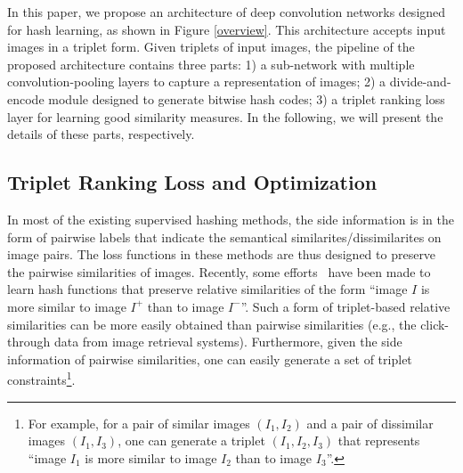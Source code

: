 \documentclass[10pt,twocolumn,letterpaper]{article}
\begin{document}
In this paper, we propose an architecture of deep convolution
networks designed for hash learning, as shown in Figure
\ref{overview}. This architecture accepts input images in a triplet
form. Given triplets of input images, the pipeline of the proposed
architecture contains three parts: 1) a sub-network with multiple
convolution-pooling layers to capture a representation of images; 2)
a divide-and-encode module designed to generate bitwise hash
codes; 3) a triplet ranking loss layer for learning good similarity
measures. In the following, we will present the details of these
parts, respectively.

\subsection{Triplet Ranking Loss and Optimization}
In most of the existing supervised hashing methods, the side
information is in the form of pairwise labels that indicate the
semantical similarites/dissimilarites on image pairs. The loss
functions in these methods are thus designed to preserve the
pairwise similarities of images. Recently, some
efforts~\cite{triplet,CGHash} have been made to learn hash functions
that preserve relative similarities of the form ``image $I$ is more
similar to image $I^+$ than to image $I^-$''. Such a form of
triplet-based relative similarities can be more easily obtained than
pairwise similarities (e.g., the click-through data from image
retrieval systems). Furthermore, given the side information of
pairwise similarities, one can easily generate a set of triplet
constraints\footnote{For example, for a pair of similar images
$(I_1,I_2)$ and a pair of dissimilar images $(I_1,I_3)$, one can
generate a triplet $(I_1,I_2,I_3)$ that represents ``image $I_1$ is
more similar to image $I_2$ than to image $I_3$''.}.
\end{document}
